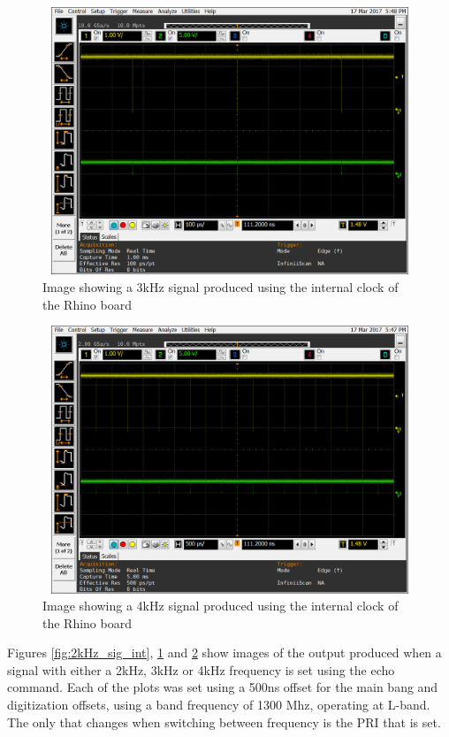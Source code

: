 \documentclass[12pt, a4paper]{article}
\begin{document}
	\begin{figure}[t]
		\centering
		\includegraphics[width=13cm, height=8cm]{3khz_mb_offset_500_ns}
		\caption{Image showing a 3kHz signal produced using the internal clock of the Rhino board}
		\label{fig:3kHz_sig_int}
	\end{figure}
	
	\begin{figure}[t]
		\centering
		\includegraphics[width=13cm, height=8cm]{4khz_mb_offset_500_ns}
		\caption{Image showing a 4kHz signal produced using the internal clock of the Rhino board}
		\label{fig:4kHz_sig_int}
	\end{figure}


Figures \ref{fig:2kHz_sig_int}, \ref{fig:3kHz_sig_int} and \ref{fig:4kHz_sig_int} show images of the output produced when a signal with either a 2kHz, 3kHz or 4kHz frequency is set using the echo command. Each of the plots was set using a 500ns offset for the main bang and digitization offsets, using a band frequency of 1300 Mhz, operating at L-band. The only that changes when switching between frequency is the PRI that is set. 
\end{document}
